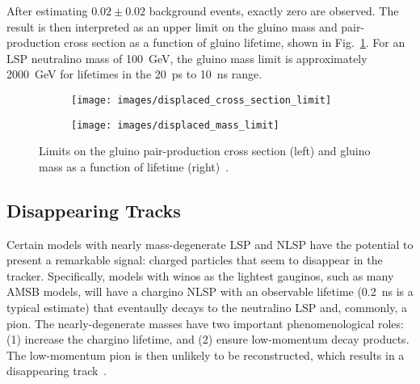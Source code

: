 \documentclass[12pt]{article}
\begin{document}
        After estimating $\num{0.02} \pm \num{0.02}$ background events, exactly zero are observed. The result is then interpreted as an upper limit on the gluino mass and pair-production cross section as a function of gluino lifetime, shown in Fig.~\ref{displaced_limit}. For an LSP neutralino mass of \SI{100}{\giga\electronvolt}, the gluino mass limit is approximately \SI{2000}{\giga\electronvolt} for lifetimes in the \SI{20}{\pico\s} to \SI{10}{\nano\s} range.

        \noindent \begin{figure}[htbp] \begin{center}
        \begin{subfigure}[htbp]{0.45\textwidth} \begin{center}
        \texttt{[image: images/displaced\_cross\_section\_limit]}
        \end{center} \end{subfigure}
        \begin{subfigure}[htbp]{0.45\textwidth} \begin{center}
        \texttt{[image: images/displaced\_mass\_limit]}
        \end{center} \end{subfigure}
            \caption{Limits on the gluino pair-production cross section (left) and gluino mass as a function of lifetime (right)~\cite{atlas_displaced}.}
        \label{displaced_limit}
        \end{center} \end{figure}

    \subsection{Disappearing Tracks}
        Certain models with nearly mass-degenerate LSP and NLSP have the potential to present a remarkable signal: charged particles that seem to disappear in the tracker. Specifically, models with winos as the lightest gauginos, such as many AMSB models, will have a chargino NLSP with an observable lifetime (\SI{0.2}{\nano\s} is a typical estimate) that eventaully decays to the neutralino LSP and, commonly, a pion. The nearly-degenerate masses have two important phenomenological roles: (1) increase the chargino lifetime, and (2) ensure low-momentum decay products. The low-momentum pion is then unlikely to be reconstructed, which results in a disappearing track~\cite{atlas_disappearing}.
\end{document}
